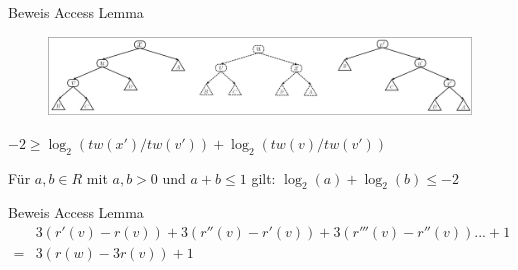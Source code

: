 \documentclass[11pt]{beamer}
\begin{document}
\begin{frame}{Beweis Access Lemma}
	\begin{figure}[H]
		\centering
		\includegraphics[width=1\textwidth]{"Medien/pres/zigZigKlein"}
		
	\end{figure}
	
	$-2 \geq \log_2\left(\mathit{tw}\left(x'\right) / \mathit{tw}\left(v'\right)\right) +   \log_2\left(\mathit{tw}\left(v\right) / \mathit{tw}\left(v'\right)\right)$\\
	\bigskip
	
	Für $a,b \in \mathit{R}$ mit $a,b > 0$ und $a + b \leq 1$ gilt: $\log_2\left(a\right) + \log_2\left(b\right) \leq -2$
\end{frame}
\begin{frame}{Beweis Access Lemma}
		\begin{align*}
		&	3(r'(v) - r(v) ) + 3(r''(v) - r'(v)) + 3(r'''(v) - r''(v))...  + 1 \\
		= & 3 (r(w) - 3r(v))  + 1 
	\end{align*}
\end{frame}
\end{document}
